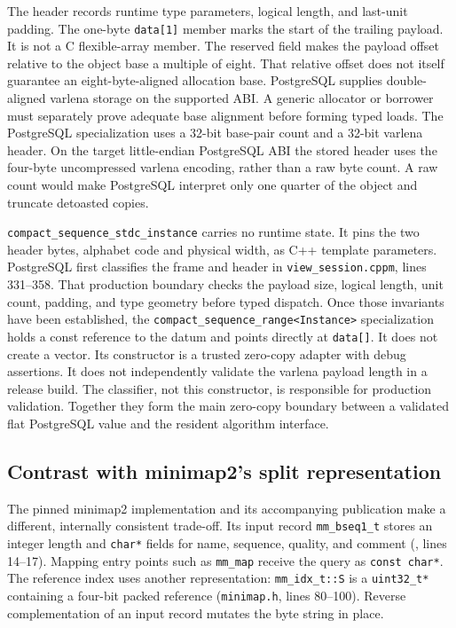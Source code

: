 The header records runtime type parameters, logical length, and last-unit
padding.  The one-byte \texttt{data[1]} member marks the start of the
trailing payload. It is not a C flexible-array member.  The reserved field
makes the payload offset relative to the object base a multiple of eight.
That relative offset does not itself guarantee an eight-byte-aligned
allocation base.  PostgreSQL supplies double-aligned varlena storage on the
supported ABI. A generic allocator or borrower must separately prove adequate
base alignment before forming typed loads.  The PostgreSQL specialization uses
a 32-bit base-pair count and a 32-bit varlena header.
On the target little-endian PostgreSQL ABI the stored header uses the
four-byte uncompressed varlena encoding, rather than a raw byte count.  A raw
count would make PostgreSQL interpret only one quarter of the object and
truncate detoasted copies.

\texttt{compact\_sequence\_stdc\_instance} carries no runtime state.  It pins
the two header bytes, alphabet code and physical width, as C++ template
parameters.  PostgreSQL first classifies the frame and header in
\texttt{view\_session.cppm}, lines 331--358.  That production boundary checks
the payload size, logical length, unit count, padding, and type geometry before
typed dispatch.  Once those invariants have been established, the
\texttt{compact\_sequence\_range<Instance>} specialization holds a const
reference to the datum and points directly at \texttt{data[]}.  It does not
create a vector.  Its constructor is a trusted zero-copy adapter with debug
assertions.  It does not independently validate the varlena payload length in
a release build.  The classifier, not this constructor, is responsible for
production validation.  Together they form the main zero-copy boundary between
a validated flat PostgreSQL value and the resident algorithm interface.

\subsection{Contrast with minimap2's split representation}

The pinned minimap2 implementation and its accompanying publication
\cite{minimap2_software,minimap2_paper} make a different, internally
consistent trade-off.  Its input record \texttt{mm\_bseq1\_t} stores an integer length and
\texttt{char*} fields for name, sequence, quality, and comment
(, lines 14--17).  Mapping
entry points such as \texttt{mm\_map} receive the query as
\texttt{const char*}.  The reference index uses another representation:
\texttt{mm\_idx\_t::S} is a \texttt{uint32\_t*} containing a four-bit packed
reference (\texttt{minimap.h}, lines 80--100).  Reverse complementation of an
input record mutates the byte string in place.

